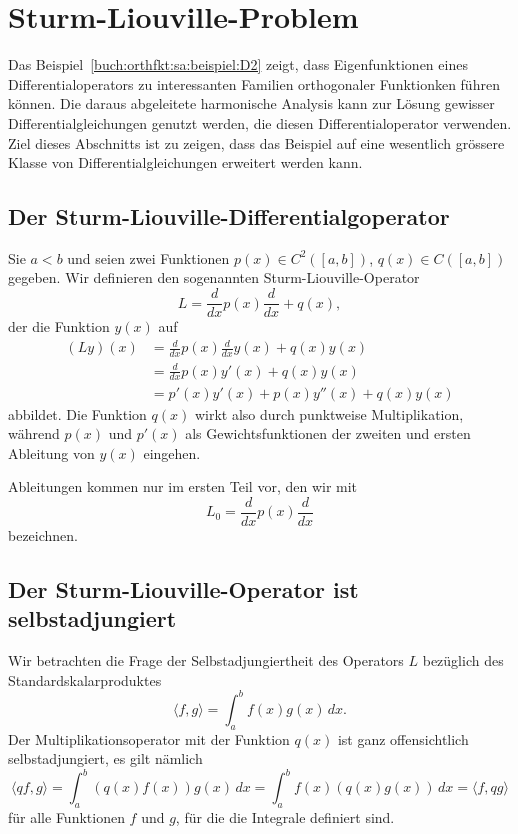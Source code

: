 %
%
%
\section{Sturm-Liouville-Problem
\label{buch:orthofkt:section:sturmliouville}}
Das Beispiel~\ref{buch:orthfkt:sa:beispiel:D2} zeigt, dass
Eigenfunktionen eines Differentialoperators zu interessanten
Familien orthogonaler Funktionken führen können.
Die daraus abgeleitete harmonische Analysis kann zur Lösung
gewisser Differentialgleichungen genutzt werden, die diesen
Differentialoperator verwenden.
Ziel dieses Abschnitts ist zu zeigen, dass das Beispiel auf
eine wesentlich grössere Klasse von Differentialgleichungen
erweitert werden kann.

%
%
\subsection{Der Sturm-Liouville-Differentialgoperator
\label{buch:orthofkt:sturmliouville:subsection:operator}}
Sie $a<b$ und seien zwei Funktionen
$p(x)\in C^2([a,b])$, $q(x)\in C([a,b])$ gegeben.
Wir definieren den sogenannten Sturm-Liouville-Operator
\[
L = \frac{d}{dx} p(x) \frac{d}{dx} + q(x),
\]
der die Funktion $y(x)$ auf
\begin{align*}
(Ly)(x)
&=
\frac{d}{dx}p(x)\frac{d}{dx}y(x) + q(x)y(x)
\\
&=
\frac{d}{dx}p(x)y'(x) + q(x)y(x)
\\
&=
p'(x)y'(x)+p(x)y''(x)+q(x)y(x)
\end{align*}
abbildet.
Die Funktion $q(x)$ wirkt also durch punktweise Multiplikation,
während $p(x)$ und $p'(x)$ als Gewichtsfunktionen der zweiten und
ersten Ableitung von $y(x)$ eingehen.

Ableitungen kommen nur im ersten Teil vor, den wir mit
\[
L_0
=
\frac{d}{dx}p(x)\frac{d}{dx}
\]
bezeichnen.

%
%
\subsection{Der Sturm-Liouville-Operator ist selbstadjungiert}
Wir betrachten die Frage der Selbstadjungiertheit des
Operators $L$ bezüglich des Standardskalarproduktes
\[
\langle f,g\rangle
=
\int_a^b f(x)g(x)\,dx.
\]
Der Multiplikationsoperator mit der Funktion $q(x)$ ist ganz
offensichtlich selbstadjungiert, es gilt nämlich
\[
\langle qf,g\rangle
=
\int_a^b (q(x)f(x))g(x)\,dx
=
\int_a^b f(x)(q(x)g(x))\,dx
=
\langle f,qg\rangle
\]
für alle Funktionen $f$ und $g$, für die die Integrale definiert sind.

